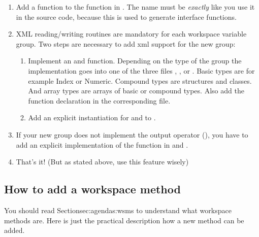 \begin{enumerate}
\item Add a  function to
  the function  in .
  The name must be \emph{exactly} like you use it in the source code,
  because this is used to generate interface functions.
\item XML reading/writing routines are mandatory for each workspace variable
  group. Two steps are necessary to add xml support for the new group:
  \begin{enumerate}
  \item Implement an 
    and  function. Depending
    on the type of the group the implementation goes into one
    of the three files ,
    , or
    . Basic types are for example Index
    or Numeric. Compound types are structures and classes. And array types are
    arrays of basic or compound types. Also add the function declaration in the
    corresponding  file.
  \item Add an explicit instantiation for
     and
     to .
  \end{enumerate}
\item If your new group does not implement the output operator
  (), you have to add an explicit implementation
  of the  function in  and
  .
\item That's it! (But as stated above, use this feature wisely)
\end{enumerate}



\subsection{How to add a workspace method}

You should read Section{sec:agendas:wsms} to understand what workspace
methods are. Here is just the practical description how a new
method can be added.

